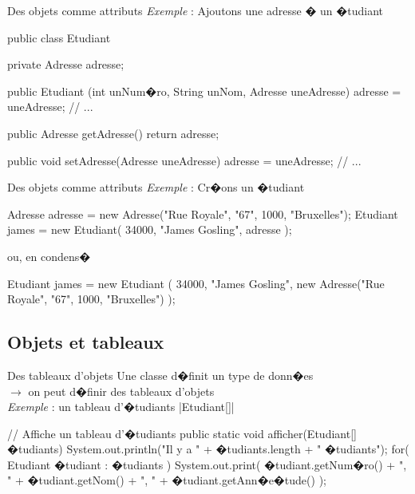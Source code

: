 \begin{frame}[fragile]{Des objets comme attributs}
\emph{Exemple} : Ajoutons une adresse � un �tudiant
\begin{Java}
public class Etudiant {
  private Adresse adresse;
  
  public Etudiant (int unNum�ro, String unNom, Adresse uneAdresse) {
    adresse = uneAdresse;
    // ...
  }

  public Adresse getAdresse() {return adresse;}

  public void setAdresse(Adresse uneAdresse) {
    adresse = uneAdresse;
  }
  // ... 
}
\end{Java}
\end{frame}

\begin{frame}[fragile]{Des objets comme attributs}
\emph{Exemple} : Cr�ons un �tudiant
\begin{Java}
 Adresse adresse = new Adresse("Rue Royale", "67", 1000, "Bruxelles");
 Etudiant james = new Etudiant( 34000, "James Gosling", adresse );
\end{Java}
ou, en condens�
\begin{Java}
  Etudiant james = new Etudiant ( 
                       34000, "James Gosling", 
                       new Adresse("Rue Royale", "67", 1000, "Bruxelles") 
           );
\end{Java}
\end{frame}

\subsection{Objets et tableaux}

\begin{frame}[fragile]{Des tableaux d'objets}
Une classe d�finit un type de donn�es 
\\$\longrightarrow$ on peut d�finir des tableaux d'objets
\\\bigskip
\emph{Exemple} : un tableau d'�tudiants \java|Etudiant[]|
\begin{Java}
// Affiche un tableau d'�tudiants
public static void afficher(Etudiant[] �tudiants) {
    System.out.println("Il y a " + �tudiants.length + " �tudiants");
    for( Etudiant �tudiant : �tudiants ) {
        System.out.print( �tudiant.getNum�ro() 
                 + ", " + �tudiant.getNom() 
                 + ", " + �tudiant.getAnn�e�tude() 
                 );
    }
}
\end{Java}
\end{frame}


